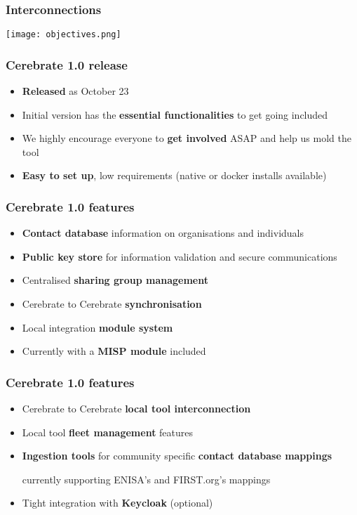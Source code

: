\begin{frame}
\frametitle{Interconnections}
    \begin{center}
        \texttt{[image: objectives.png]}
    \end{center}
\end{frame}

\begin{frame}
	\frametitle{Cerebrate 1.0 release}
	\begin{itemize}
                \item {\bf Released} as October 23
                \item Initial version has the {\bf essential functionalities} to get going included
                \item We highly encourage everyone to {\bf get involved} ASAP and help us mold the tool
                \item {\bf Easy to set up}, low requirements (native or docker installs available)
	\end{itemize}
\end{frame}

\begin{frame}
	\frametitle{Cerebrate 1.0 features}
	\begin{itemize}
            \item {\bf Contact database} \- information on organisations and individuals
            \item {\bf Public key store} for information validation and secure communications
            \item Centralised {\bf sharing group management}
            \item Cerebrate to Cerebrate {\bf synchronisation}
            \item Local integration {\bf module system}
            \item Currently with a {\bf MISP module} included
	\end{itemize}
\end{frame}


\begin{frame}
	\frametitle{Cerebrate 1.0 features}
	\begin{itemize}
            \item Cerebrate to Cerebrate {\bf local tool interconnection}
            \item Local tool {\bf fleet management} features
            \item {\bf Ingestion tools} for community specific {\bf contact database mappings}
            \begin{itemize}
            currently supporting ENISA's and FIRST.org's mappings
            \end{itemize}
            \item Tight integration with {\bf Keycloak} (optional)
	\end{itemize}
\end{frame}

